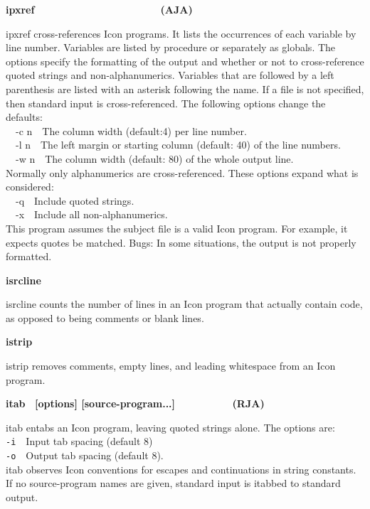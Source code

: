 {{\sffamily\bfseries
ipxref\ \ \ \ \ \ \ \ \ \ \ \ \ \ \ \ \ \ \ \ \ \ (AJA)}

\textsf{ipxref} cross-references Icon programs.
It lists the occurrences of each variable by line number. Variables are
listed by procedure or separately as globals. The options specify the
formatting of the output and whether or not to cross-reference quoted
strings and non-alphanumerics. Variables that are followed by a left
parenthesis are listed with an asterisk following the name. If a file
is not specified, then standard input is cross-referenced. The
following options change the defaults:\\
\ \ \textsf{{}-c n}\ \ The column width (default:4) per line
number.\\
\ \ \textsf{{}-l n}\ \ The left margin or starting column (default: 40)
of the line numbers.\\
\ \ \textsf{{}-w n}\ \ The column width (default: 80) of the whole
output line.\\
Normally only alphanumerics are cross-referenced. These options expand
what is considered:\\
\ \ \textsf{{}-q}\ \ Include quoted strings.\\
\ \ \textsf{{}-x}\ \ Include all non-alphanumerics.\\
This program assumes the subject file is a valid Icon program. For
example, it expects quotes be matched. Bugs: In some situations, the
output is not properly formatted.

{\sffamily\bfseries
isrcline\ \ \ \ \ \ \ \ \ \ \ \ \ \ \ \ \ \ \ \ }

\textsf{isrcline} counts the number of lines in an Icon program that
actually contain code, as opposed to being comments or blank lines.

{\sffamily\bfseries
istrip\ \ \ \ \ \ \ \ \ \ \ \ \ \ \ \ \ \ \ \ \ \ }

\textsf{istrip} removes comments, empty lines, and leading whitespace
from an Icon program.

{\sffamily\bfseries
itab \ \textrm{\textmd{[options]
[source-program...]\ \ \ \ \ \ \ \ \ \ }}(RJA)}

\textsf{itab} entabs an Icon program, leaving quoted strings alone. The
options are:\\
\texttt{{}-i}\ \ Input tab spacing (default 8)\\
\texttt{{}-o}\ \ Output tab spacing (default 8).\\
\textsf{itab} observes Icon conventions for escapes and continuations in
string constants. If no source-program names are given, standard input
is {\textquotedbl}itabbed{\textquotedbl} to standard output.

}
